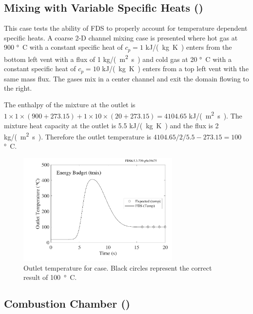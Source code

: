 \documentclass[11pt]{book}
\begin{document}
\subsection{Mixing with Variable Specific Heats (\texorpdfstring{}{energy\_budget\_tmix})}
\label{energy_budget_tmix}

This case tests the ability of FDS to properly account for temperature dependent specific heats.  A coarse 2-D channel mixing case is presented where hot gas at 900 \si{\degree C} with a constant specific heat of $c_p=1$ \si{kJ/(kg.K)} enters from the bottom left vent with a flux of 1 \si{kg/(m^2.s)} and cold gas at 20 \si{\degree C} with a constant specific heat of $c_p=10$ \si{kJ/(kg.K)} enters from a top left vent with the same mass flux.  The gases mix in a center channel and exit the domain flowing to the right.

The enthalpy of the mixture at the outlet is $1 \times 1 \times (900+273.15) + 1 \times 10 \times (20+273.15) = 4104.65$ \si{kJ/(m^2.s)}.  The mixture heat capacity at the outlet is 5.5 \si{kJ/(kg.K)} and the flux is 2 \si{kg/(m^2.s)}.  Therefore the outlet temperature is $4104.65/2/5.5 - 273.15 = 100$ \si{\degree C}.
\begin{figure}[ht]
\centering
\includegraphics[height=2.2in]{SCRIPT_FIGURES/energy_budget_tmix}
\caption[The  test case]{\label{fig_outlet_temperature} Outlet temperature for  case.  Black circles represent the correct result of 100~\si{\degree C}.}
\end{figure}


\subsection{Combustion Chamber (\texorpdfstring{}{energy\_budget\_combustion})}
\label{energy_budget_combustion}
\end{document}
